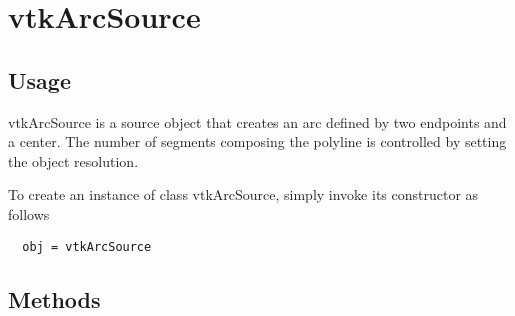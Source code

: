 \section{vtkArcSource}

\subsection{Usage}

 vtkArcSource is a source object that creates an arc defined by two 
 endpoints and a center. The number of segments composing the polyline is
 controlled by setting the object resolution.

To create an instance of class vtkArcSource, simply
invoke its constructor as follows
\begin{verbatim}
  obj = vtkArcSource
\end{verbatim}
\subsection{Methods}

